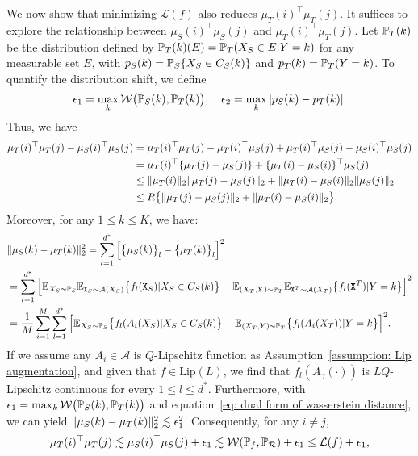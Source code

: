 We now show that minimizing $\mathcal{L}(f)$ also reduces $\mu_T(i)^\top\mu_T(j)$. It suffices to explore the relationship between $\mu_S(i)^\top\mu_S(j)$ and $\mu_T(i)^\top\mu_T(j)$. Let $\P_T(k)$ be the distribution defined by $\P_T(k)(E) = \P_T(X_S \in E \vert Y = k)$ for any measurable set $E$, with $p_S(k) = \P_S\{X_S \in C_S(k)\}$ and $p_T(k) = \P_T(Y = k)$. To quantify the distribution shift, we define 
\begin{align}\label{eq: distribution shift}
\epsilon_1 = \max_k\mathcal{W}\big(\P_S(k), \P_T(k)\big),\quad \epsilon_2 = \max_k\abs{p_S(k)- p_T(k)}.    
\end{align}
Thus, we have 
\begin{align*}
    \mu_T(i)^\top\mu_T(j) - \mu_S(i)^\top\mu_S(j) &= \mu_T(i)^\top\mu_T(j) - \mu_T(i)^\top\mu_S(j) + \mu_T(i)^\top\mu_S(j) - \mu_S(i)^\top\mu_S(j) \\
    &=\mu_T(i)^\top\{\mu_T(j) - \mu_S(j)\} + \{\mu_T(i) - \mu_S(i)\}^\top\mu_S(j) \\
    &\leq \norm{\mu_T(i)}_2\norm{\mu_T(j) - \mu_S(j)}_2 + \norm{\mu_T(i) - \mu_S(i)}_2\norm{\mu_S(j)}_2 \\
    &\leq R\big\{\norm{\mu_T(j) - \mu_S(j)}_2 + \norm{\mu_T(i) - \mu_S(i)}_2\big\}.
\end{align*}
Moreover, for any $1 \leq k \leq K$, we have:
\begin{align*}
&\norm{\mu_S(k) - \mu_T(k)}_2^2 = \sum_{l=1}^{d^*}\Big[\big\{\mu_S(k)\big\}_l - \big\{\mu_T(k)\big\}_l\Big]^2 \\
&= \sum_{l=1}^{d^*}\Big[\E_{X_S \sim \P_S}\E_{\mathtt{X}_S \sim \mathcal{A}(X_S)}\big\{f_l(\mathtt{X}_S) \vert X_S \in C_S(k)\big\} - \E_{(X_T, Y) \sim \P_T}\E_{\mathtt{X}^T \sim \mathcal{A}(X_T)}\big\{f_l(\mathtt{X}^T) \vert Y = k\big\}\Big]^2 \\
&= \frac{1}{M}\sum_{i=1}^M\sum_{l=1}^{d^*}\Big[\E_{X_S \sim \P_S}\big\{f_l(A_i(X_S) \vert X_S \in C_S(k)\big\} - \E_{(X_T, Y) \sim \P_T}\big\{f_l(A_i(X_T)) \vert Y = k\big\}\Big]^2.
\end{align*}
If we assume any $A_i \in \mathcal{A}$ is $Q$-Lipschitz function as Assumption~\ref{assumption: Lip augmentation}, and given that $f \in \mathrm{Lip}(L)$, we find that $f_l(A_\gamma(\cdot))$ is $LQ$-Lipschitz continuous for every $1 \leq l \leq d^*$. Furthermore, with $\epsilon_1 = \max_k\mathcal{W}\big(\P_S(k), \P_T(k)\big)$ and equation~\eqref{eq: dual form of wasserstein distance}, we can yield $\norm{\mu_S(k) - \mu_T(k)}_2^2 \lesssim \epsilon_1^2$. Consequently, for any $i \neq j$,
\begin{align}\label{eq : downstream divergence ≤ L + ɛ}
    \mu_T(i)^\top\mu_T(j) \lesssim \mu_S(i)^\top\mu_S(j) + \epsilon_1 \lesssim \mathcal{W}(\P_f, \P_\mathcal{R}) + \epsilon_1 \leq \mathcal{L}(f) + \epsilon_1,
\end{align}
